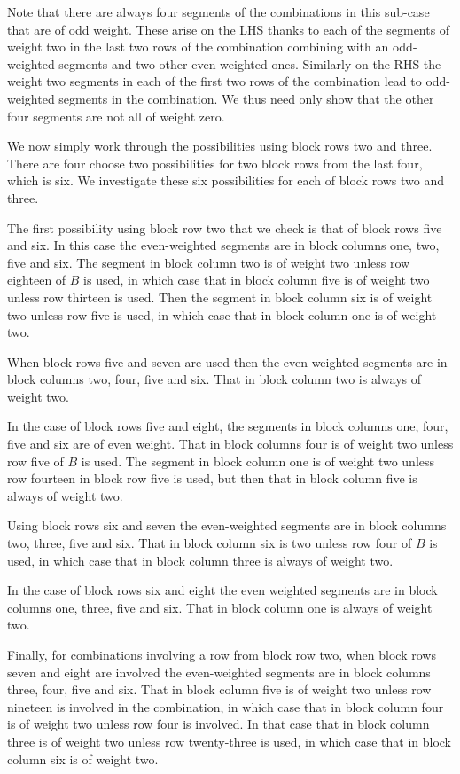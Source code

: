 Note that there are always four segments of the combinations in this sub-case that are of odd weight.
These arise on the LHS thanks to each of the segments of weight two in the last two rows of the combination combining with an odd-weighted segments and two other even-weighted ones.
Similarly on the RHS the weight two segments in each of the first two rows of the combination lead to odd-weighted segments in the combination.
We thus need only show that the other four segments are not all of weight zero.

We now simply work through the possibilities using block rows two and three.
There are four choose two possibilities for two block rows from the last four, which is six.
We investigate these six possibilities for each of block rows two and three.

The first possibility using block row two that we check is that of block rows five and six.
In this case the even-weighted segments are in block columns one, two, five and six.
The segment in block column two is of weight two unless row eighteen of $B$ is used, in which case that in block column five is of weight two unless row thirteen is used.
Then the segment in block column six is of weight two unless row five is used, in which case that in block column one is of weight two.

When block rows five and seven are used then the even-weighted segments are in block columns two, four, five and six.
That in block column two is always of weight two.

In the case of block rows five and eight, the segments in block columns one, four, five and six are of even weight.
That in block columns four is of weight two unless row five of $B$ is used.
The segment in block column one is of weight two unless row fourteen in block row five is used, but then that in block column five is always of weight two.

Using block rows six and seven the even-weighted segments are in block columns two, three, five and six.
That in block column six is two unless row four of $B$ is used, in which case that in block column three is always of weight two.

In the case of block rows six and eight the even weighted segments are in block columns one, three, five and six.
That in block column one is always of weight two.

Finally, for combinations involving a row from block row two, when block rows seven and eight are involved the even-weighted segments are in block columns three, four, five and six.
That in block column five is of weight two unless row nineteen is involved in the combination, in which case that in block column four is of weight two unless row four is involved.
In that case that in block column three is of weight two unless row twenty-three is used, in which case that in block column six is of weight two.

